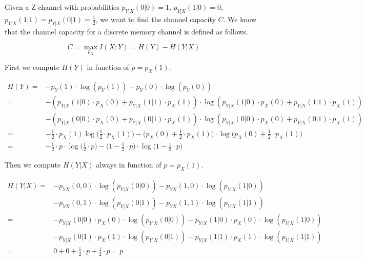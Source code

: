
Given a Z channel with probabilities $p_{Y|X}(0|0)=1$, $p_{Y|X}(1|0)=0$, $p_{Y|X}(1|1)=p_{Y|X}(0|1)=\frac{1}{2}$, we want to find the channel capacity $C$. We know that the channel capacity for a discrete memory channel is defined as follows.

\begin{equation}
	C = \max_{p_X} I(X;Y) = H(Y)-H(Y|X)
\end{equation}

First we compute $H(Y)$ in function of $p=p_X(1)$.

\begin{equation}
\begin{aligned}
	H(Y)= & -p_Y(1)\cdot\log(p_Y(1))-p_Y(0)\cdot\log(p_Y(0)) \\
	= & -(p_{Y|X}(1|0) \cdot p_X(0) + p_{Y|X}(1|1) \cdot p_X(1)) \cdot\log(p_{Y|X}(1|0) \cdot p_X(0) + p_{Y|X}(1|1) \cdot p_X(1)) \\ & -(p_{Y|X}(0|0) \cdot p_X(0) + p_{Y|X}(0|1) \cdot p_X(1)) \cdot\log(p_{Y|X}(0|0) \cdot p_X(0) + p_{Y|X}(0|1) \cdot p_X(1)) \\
	= & -\frac{1}{2}\cdot p_X(1)\log\Big(\frac{1}{2}\cdot p_X(1)\Big)-\Big(p_X(0)+\frac{1}{2}\cdot p_X(1)\Big)\cdot \log \Big(p_X(0)+\frac{1}{2}\cdot p_X(1)\Big) \\
	= & -\frac{1}{2}\cdot p \cdot \log\Big(\frac{1}{2}\cdot p\Big)-\Big(1-\frac{1}{2}\cdot p\Big)\cdot \log \Big(1-\frac{1}{2}\cdot p\Big)
\end{aligned}
\end{equation}

Then we compute $H(Y|X)$ always in function of $p=p_X(1)$.

\begin{equation}
\begin{aligned}
	H(Y|X) = & -p_{YX}(0,0) \cdot \log (p_{Y|X}(0|0)) -p_{YX}(1,0) \cdot \log (p_{Y|X}(1|0)) \\
	& -p_{YX}(0,1) \cdot \log (p_{Y|X}(0|1)) -p_{YX}(1,1) \cdot \log (p_{Y|X}(1|1)) \\ =
	& -p_{Y|X}(0|0) \cdot p_X(0) \cdot \log (p_{Y|X}(0|0)) -p_{Y|X}(1|0) \cdot p_X(0) \cdot \log (p_{Y|X}(1|0)) \\
	& -p_{Y|X}(0|1) \cdot p_X(1) \cdot \log (p_{Y|X}(0|1)) -p_{Y|X}(1|1) \cdot p_X(1) \cdot \log (p_{Y|X}(1|1)) \\ =	& 0 + 0 + \frac{1}{2} \cdot p + \frac{1}{2} \cdot p = p
\end{aligned}
\end{equation}

